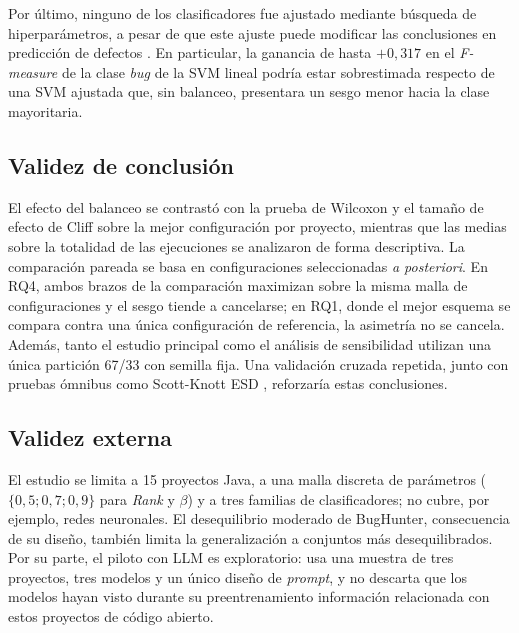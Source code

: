 Por último, ninguno de los clasificadores fue ajustado mediante búsqueda de hiperparámetros, a pesar de que este ajuste puede modificar las conclusiones en predicción de defectos \cite{tantithamthavorn2019}. En particular, la ganancia de hasta $+0{,}317$ en el \textit{F-measure} de la clase \textit{bug} de la SVM lineal podría estar sobrestimada respecto de una SVM ajustada que, sin balanceo, presentara un sesgo menor hacia la clase mayoritaria.

\subsection{Validez de conclusión}

El efecto del balanceo se contrastó con la prueba de Wilcoxon y el tamaño de efecto de Cliff sobre la mejor configuración por proyecto, mientras que las medias sobre la totalidad de las ejecuciones se analizaron de forma descriptiva. La comparación pareada se basa en configuraciones seleccionadas \textit{a posteriori}. En RQ4, ambos brazos de la comparación maximizan sobre la misma malla de configuraciones y el sesgo tiende a cancelarse; en RQ1, donde el mejor esquema se compara contra una única configuración de referencia, la asimetría no se cancela. Además, tanto el estudio principal como el análisis de sensibilidad utilizan una única partición 67/33 con semilla fija. Una validación cruzada repetida, junto con pruebas ómnibus como Scott-Knott ESD \cite{tantithamthavorn2017}, reforzaría estas conclusiones.

\subsection{Validez externa}

El estudio se limita a 15 proyectos Java, a una malla discreta de parámetros ($\{0{,}5; 0{,}7; 0{,}9\}$ para \textit{Rank} y $\beta$) y a tres familias de clasificadores; no cubre, por ejemplo, redes neuronales. El desequilibrio moderado de BugHunter, consecuencia de su diseño, también limita la generalización a conjuntos más desequilibrados. Por su parte, el piloto con LLM es exploratorio: usa una muestra de tres proyectos, tres modelos y un único diseño de \textit{prompt}, y no descarta que los modelos hayan visto durante su preentrenamiento información relacionada con estos proyectos de código abierto.
